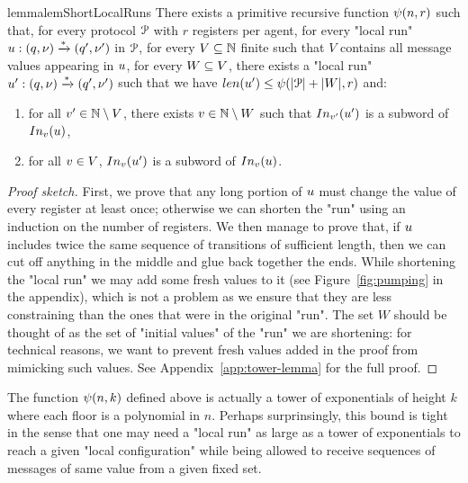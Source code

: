 \begin{restatable}{lemma}{lemShortLocalRuns}
	\label{lem:short-local-runs}
	There exists a primitive recursive function $\psi(n,r)$ such that, for every protocol $\mathcal{P}$ with $r$ registers per agent, for every "local run" $u: (q, \nu) \xrightarrow{*} (q', \nu')$ in $\mathcal{P}$, for every $V \subseteq \mathbb{N}$ finite such that $V$ contains all message values appearing in $u$,  for every $W \subseteq V$, there exists a "local run" $u': (q, \nu) \xrightarrow{*} (q', \nu')$ such that we have $\length{\localrun'} \leq \towerfun(\size{\prot} + \size{\Vinit},r)$ and:
	\begin{enumerate}
		\item \label{item:shorterrun_anyvalue} for all $v' \in \mathbb{N} \setminus V$, there exists $v \in \mathbb{N} \setminus W$ such that $\vinput{\aval'}{\localrun'}$ is a subword of $\vinput{\aval}{\localrun}$,
		\item \label{item:shorterrun_oldvalues} for all $v \in V$, $\vinput{\aval}{\localrun'}$ is a subword of $\vinput{\aval}{\localrun}$. 
	\end{enumerate}
\end{restatable}

\begin{proof}[Proof sketch]
	First, we prove that any long portion of $u$ must change the value of every register at least once; otherwise we can shorten the "run" using an induction on the number of registers. We then manage to prove that, if $u$ includes twice the same sequence of transitions of sufficient length, then we can cut off anything in the middle and glue back together the ends. While shortening the "local run" we may add some fresh values to it (see Figure~\ref{fig:pumping} in the appendix), which is not a problem as we ensure that they are less constraining than the ones that were in the original "run". The set $W$ should be thought of as the set of "initial values" of the "run" we are shortening: for technical reasons, we want to prevent fresh values added in the proof from mimicking such values.
	See Appendix~\ref{app:tower-lemma} for the full proof.
\end{proof}

\begin{remark}
The function $\psi(n,k)$ defined above is actually a tower of exponentials of height $k$ where each floor is a polynomial in $n$. Perhaps surprinsingly, this bound is tight in the sense that one may need a "local run" as large as a tower of exponentials to reach a given "local configuration" while being allowed to receive sequences of messages of same value from a given fixed set. 
\end{remark}

